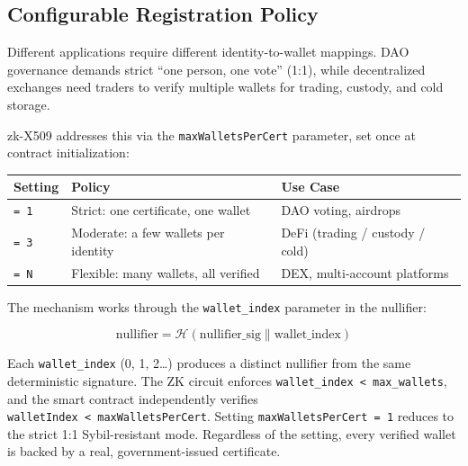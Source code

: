 \documentclass[11pt, a4paper]{article}
\begin{document}
\subsection{Configurable Registration
Policy}\label{configurable-registration-policy}

Different applications require different identity-to-wallet mappings.
DAO governance demands strict ``one person, one vote'' (1:1), while
decentralized exchanges need traders to verify multiple wallets for
trading, custody, and cold storage.

zk-X509 addresses this via the \texttt{maxWalletsPerCert} parameter, set
once at contract initialization:

\begin{longtable}[]{@{}
  >{\raggedright\arraybackslash}p{}
  >{\raggedright\arraybackslash}p{}
  >{\raggedright\arraybackslash}p{}@{}}
\toprule\noalign{}
\begin{minipage}[b]{\linewidth}\raggedright
Setting
\end{minipage} & \begin{minipage}[b]{\linewidth}\raggedright
Policy
\end{minipage} & \begin{minipage}[b]{\linewidth}\raggedright
Use Case
\end{minipage} \\
\midrule\noalign{}
\endhead
\bottomrule\noalign{}
\endlastfoot
\texttt{=\ 1} & Strict: one certificate, one wallet & DAO voting,
airdrops \\
\texttt{=\ 3} & Moderate: a few wallets per identity & DeFi (trading /
custody / cold) \\
\texttt{=\ N} & Flexible: many wallets, all verified & DEX,
multi-account platforms \\
\end{longtable}

The mechanism works through the \texttt{wallet\_index} parameter in the
nullifier:

\[\text{nullifier} = \mathcal{H}(\text{nullifier\_sig} \| \text{wallet\_index})\]

Each \texttt{wallet\_index} (0, 1, 2\ldots) produces a distinct
nullifier from the same deterministic signature. The ZK circuit enforces
\texttt{wallet\_index\ \textless{}\ max\_wallets}, and the smart
contract independently verifies
\texttt{walletIndex\ \textless{}\ maxWalletsPerCert}. Setting
\texttt{maxWalletsPerCert\ =\ 1} reduces to the strict 1:1
Sybil-resistant mode. Regardless of the setting, every verified wallet
is backed by a real, government-issued certificate.
\end{document}

